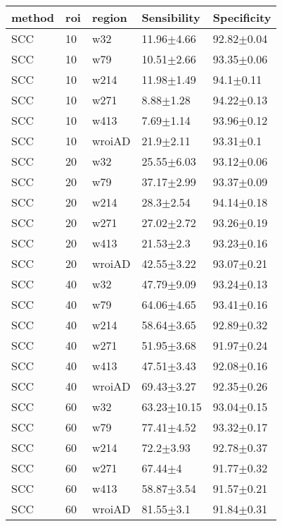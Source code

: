 \begin{table}[ht]
\begin{center}
\begin{tabular}{lllll}
  \hline
method & roi & region & Sensibility & Specificity \\ 
  \hline
  SCC & 10 & w32 & 11.96$\pm$4.66 & 92.82$\pm$0.04 \\ 
  SCC & 10 & w79 & 10.51$\pm$2.66 & 93.35$\pm$0.06 \\ 
  SCC & 10 & w214 & 11.98$\pm$1.49 & 94.1$\pm$0.11 \\ 
  SCC & 10 & w271 & 8.88$\pm$1.28 & 94.22$\pm$0.13 \\ 
  SCC & 10 & w413 & 7.69$\pm$1.14 & 93.96$\pm$0.12 \\ 
  SCC & 10 & wroiAD & 21.9$\pm$2.11 & 93.31$\pm$0.1 \\ 
  SCC & 20 & w32 & 25.55$\pm$6.03 & 93.12$\pm$0.06 \\ 
  SCC & 20 & w79 & 37.17$\pm$2.99 & 93.37$\pm$0.09 \\ 
  SCC & 20 & w214 & 28.3$\pm$2.54 & 94.14$\pm$0.18 \\ 
  SCC & 20 & w271 & 27.02$\pm$2.72 & 93.26$\pm$0.19 \\ 
  SCC & 20 & w413 & 21.53$\pm$2.3 & 93.23$\pm$0.16 \\ 
  SCC & 20 & wroiAD & 42.55$\pm$3.22 & 93.07$\pm$0.21 \\ 
  SCC & 40 & w32 & 47.79$\pm$9.09 & 93.24$\pm$0.13 \\ 
  SCC & 40 & w79 & 64.06$\pm$4.65 & 93.41$\pm$0.16 \\ 
  SCC & 40 & w214 & 58.64$\pm$3.65 & 92.89$\pm$0.32 \\ 
  SCC & 40 & w271 & 51.95$\pm$3.68 & 91.97$\pm$0.24 \\ 
  SCC & 40 & w413 & 47.51$\pm$3.43 & 92.08$\pm$0.16 \\ 
  SCC & 40 & wroiAD & 69.43$\pm$3.27 & 92.35$\pm$0.26 \\ 
  SCC & 60 & w32 & 63.23$\pm$10.15 & 93.04$\pm$0.15 \\ 
  SCC & 60 & w79 & 77.41$\pm$4.52 & 93.32$\pm$0.17 \\ 
  SCC & 60 & w214 & 72.2$\pm$3.93 & 92.78$\pm$0.37 \\ 
  SCC & 60 & w271 & 67.44$\pm$4 & 91.77$\pm$0.32 \\ 
  SCC & 60 & w413 & 58.87$\pm$3.54 & 91.57$\pm$0.21 \\ 
  SCC & 60 & wroiAD & 81.55$\pm$3.1 & 91.84$\pm$0.31 \\ 

\end{tabular}
\end{center}
\end{table}

